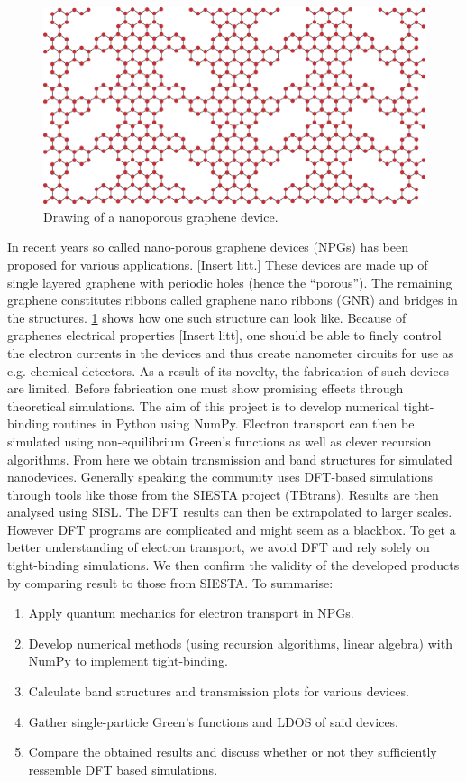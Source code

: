 \begin{figure}
	\vspace{-1em}
	\centering
	\includegraphics[width=.4\textwidth]{Figures/NPGintroGraphic.eps}
	\caption{Drawing of a nanoporous graphene device.}\label{introGraphic}
\end{figure}
In recent years so called nano-porous graphene devices (NPGs) has been proposed for various applications. [Insert litt.] These devices are made up of single layered graphene with periodic holes (hence the ``porous''). The remaining graphene constitutes ribbons called graphene nano ribbons (GNR) and bridges in the structures. \cref{introGraphic} shows how one such structure can look like.
Because of graphenes electrical properties [Insert litt], one should be able to finely control the electron currents in the devices and thus create nanometer circuits for use as e.g. chemical detectors. As a result of its novelty, the fabrication of such devices are limited. Before fabrication one must show promising effects through theoretical simulations.\newline
The aim of this project is to develop numerical tight-binding routines in Python using NumPy. Electron transport can then be simulated using non-equilibrium Green's functions as well as clever recursion algorithms. From here we obtain transmission and band structures for simulated nanodevices.\newline
Generally speaking the community uses DFT-based simulations through tools like those from the SIESTA project (TBtrans). Results are then analysed using SISL\cite{zerothi_sisl}. The DFT results can then be extrapolated to larger scales\cite{calogero_electron_2019}. However DFT programs are complicated and might seem as a blackbox. To get a better understanding of electron transport, we avoid DFT and rely solely on tight-binding simulations. We then confirm the validity of the developed products by comparing result to those from SIESTA.\newline
To summarise:
\begin{enumerate}
	\item Apply quantum mechanics for electron transport in NPGs.
	\item Develop numerical methods (using recursion algorithms, linear algebra) with NumPy to implement tight-binding.
	\item Calculate band structures and transmission plots for various devices.
	\item Gather single-particle Green’s functions and LDOS of said devices.
	\item Compare the obtained results and discuss whether or not they sufficiently ressemble DFT based simulations.
\end{enumerate}
